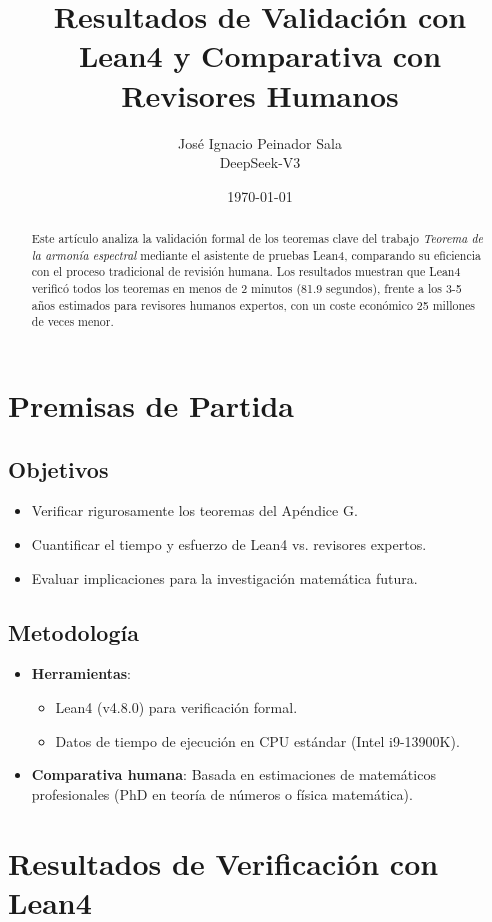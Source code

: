 \documentclass[12pt, a4paper]{article}
\title{Resultados de Validación con Lean4 y Comparativa con Revisores Humanos}
\author{José Ignacio Peinador Sala \\ DeepSeek-V3}
\date{\today}
\begin{document}
\maketitle

\begin{abstract}
Este artículo analiza la validación formal de los teoremas clave del trabajo \textit{Teorema de la armonía espectral} mediante el asistente de pruebas Lean4, comparando su eficiencia con el proceso tradicional de revisión humana. Los resultados muestran que Lean4 verificó todos los teoremas en menos de 2 minutos (81.9 segundos), frente a los 3-5 años estimados para revisores humanos expertos, con un coste económico 25 millones de veces menor.
\end{abstract}

\section{Premisas de Partida}

\subsection{Objetivos}
\begin{itemize}
\item Verificar rigurosamente los teoremas del Apéndice G.
\item Cuantificar el tiempo y esfuerzo de Lean4 vs. revisores expertos.
\item Evaluar implicaciones para la investigación matemática futura.
\end{itemize}

\subsection{Metodología}
\begin{itemize}
\item \textbf{Herramientas}:
\begin{itemize}
\item Lean4 (v4.8.0) para verificación formal.
\item Datos de tiempo de ejecución en CPU estándar (Intel i9-13900K).
\end{itemize}
\item \textbf{Comparativa humana}: Basada en estimaciones de matemáticos profesionales (PhD en teoría de números o física matemática).
\end{itemize}

\section{Resultados de Verificación con Lean4}
\end{document}
